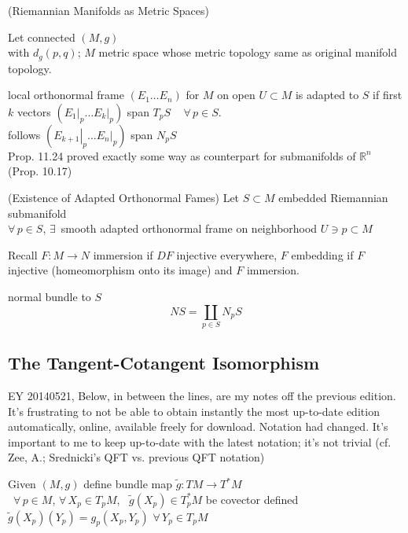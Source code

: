 \begin{theorem}[13.29] (Riemannian Manifolds as Metric Spaces)

Let connected $(M,g)$ \\
with $d_g(p,q)$; $M$ metric space whose metric topology same as original manifold topology.
\end{theorem}




local orthonormal frame $(E_1 \dots E_n)$ for $M$ on open $U\subset M$ is adapted to $S$ if first $k$ vectors $( \left. E_1 \right|_p \dots \left. E_k \right|_p)$ span $T_pS \quad \, \forall \, p \in S$. \\
\quad follows $( \left. E_{k+1} \right|_p \dots \left. E_n \right|_p )$ span $N_pS$ \\

Prop. 11.24 proved exactly some way as counterpart for submanifolds of $\mathbb{R}^n$ (Prop. 10.17)

\begin{proposition}[11.24] (Existence of Adapted Orthonormal Fames)
Let $S\subset M$ embedded Riemannian submanifold  \\
\quad $\forall \, p \in S$, $\exists \, $ smooth adapted orthonormal frame on neighborhood $U \ni p \subset M$
\end{proposition}

Recall $F:M \to N$ immersion if $DF$ injective everywhere, $F$ embedding if $F$ injective (homeomorphism onto its image) and $F$ immersion.


normal bundle to $S$  
\[
NS  = \coprod_{p \in S} N_p S
\]



\subsection*{The Tangent-Cotangent Isomorphism}

EY 20140521, Below, in between the lines, are my notes off the previous edition.  It's frustrating to not be able to obtain instantly the most up-to-date edition automatically, online, available freely for download.  Notation had changed.  It's important to me to keep up-to-date with the latest notation; it's not trivial (cf. Zee, A.; Srednicki's QFT vs. previous QFT notation)

\hrulefill

Given $(M,g)$ define bundle map $\widetilde{g}:TM \to T^*M$ \\
\quad \, $\forall \, p \in M$, $\forall \, X_p \in T_pM$, \, $\widetilde{g}(X_p) \in T_p^*M$ be covector defined $\widetilde{g}(X_p)(Y_p) = g_p(X_p,Y_p)$ \quad $\forall \, Y_p \in T_pM$ \\

